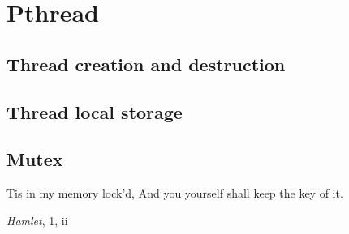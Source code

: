 \section{Pthread}

\subsection{Thread creation and destruction}

\subsection{Thread local storage}

\subsection{Mutex}

\epigraph{Tis in my memory lock'd,\newline
          And you yourself shall keep the key of it.}{\textit{Hamlet}, 1, ii}

